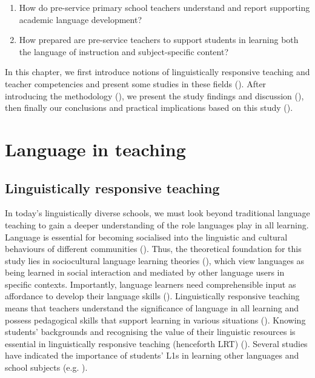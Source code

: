 \documentclass[output=paper]{langscibook}
\begin{document}
\begin{enumerate}
\item  How do pre-service primary school teachers understand and report supporting academic language development?
\item  How prepared are pre-service teachers to support students in learning both the language of instruction and subject-specific content?
\end{enumerate}

In this chapter, we first introduce notions of linguistically responsive teaching and teacher competencies and present some studies in these fields (). After introducing the methodology (), we present the study findings and discussion (), then finally our conclusions and practical implications based on this study ().

\section{Language in teaching}\label{sec:alisaari:2}
\subsection{Linguistically responsive teaching}\label{sec:alisaari:2.1}

In today’s linguistically diverse schools, we must look beyond traditional language teaching to gain a deeper understanding of the role languages play in all learning. Language is essential for becoming socialised into the linguistic and cultural behaviours of different communities (\citealt{PhinneyOng2007}). Thus, the theoretical foundation for this study lies in sociocultural language learning theories (\citealt{LantolfThorne2006, Lier2000,Vygotsky1986}), which view languages as being learned in social interaction and mediated by other language users in specific contexts. Importantly, language learners need comprehensible input as affordance to develop their language skills (\citealt{Lier2000}).  Linguistically responsive teaching means that teachers understand the significance of language in all learning and possess pedagogical skills that support learning in various situations (\citealt{Alisaari2020_Apples,LucasVillegas2013}). Knowing students' backgrounds and recognising the value of their linguistic resources is essential in linguistically responsive teaching (henceforth LRT) (\citealt{LucasVillegas2013}). Several studies have indicated the importance of students’ L1s in learning other languages and school subjects (e.g. \citealt{AgirdagVanlaar2018,Cummins2021,GanuzaHedman2018}).
\end{document}
